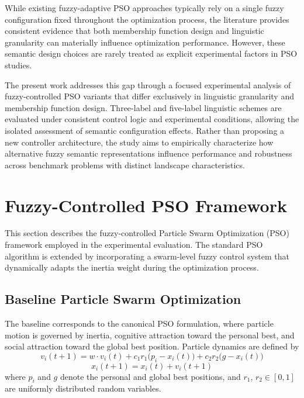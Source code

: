 \documentclass[runningheads]{llncs}
\begin{document}
While existing fuzzy-adaptive PSO approaches typically rely on a single fuzzy configuration fixed throughout the optimization process, the literature provides consistent evidence that both membership function design and linguistic granularity can materially influence optimization performance. However, these semantic design choices are rarely treated as explicit experimental factors in PSO studies.

The present work addresses this gap through a focused experimental analysis of fuzzy-controlled PSO variants that differ exclusively in linguistic granularity and membership function design. Three-label and five-label linguistic schemes are evaluated under consistent control logic and experimental conditions, allowing the isolated assessment of semantic configuration effects. Rather than proposing a new controller architecture, the study aims to empirically characterize how alternative fuzzy semantic representations influence performance and robustness across benchmark problems with distinct landscape characteristics.



\section{Fuzzy-Controlled PSO Framework}
\label{sec:fcs_pso}

This section describes the fuzzy-controlled Particle Swarm Optimization (PSO) framework employed in the experimental evaluation. The standard PSO algorithm is extended by incorporating a swarm-level fuzzy control system that dynamically adapts the inertia weight during the optimization process.

\vspace{-0.25cm}
\subsection{Baseline Particle Swarm Optimization}

The baseline corresponds to the canonical PSO formulation, where particle motion is governed by inertia, cognitive attraction toward the personal best, and social attraction toward the global best position. Particle dynamics are defined by
\begin{equation}
    v_i(t+1) = w \cdot v_i(t) + c_1 r_1 \bigl(p_i - x_i(t)\bigr) + c_2 r_2 \bigl(g - x_i(t)\bigr)
    \label{eq:pso_velocity}
\end{equation}
\begin{equation}
    x_i(t+1) = x_i(t) + v_i(t+1)
    \label{eq:pso_position}
\end{equation}
where $p_i$ and $g$ denote the personal and global best positions, and $r_1$, $r_2 \in [0,1]$ are uniformly distributed random variables.
\end{document}
